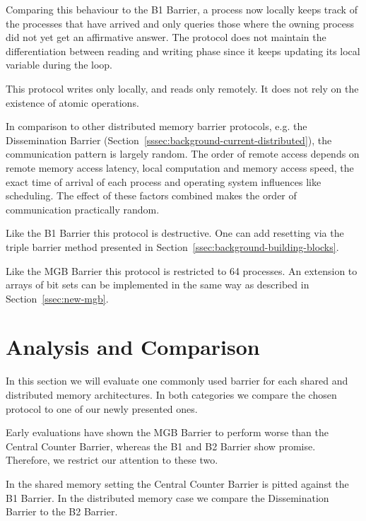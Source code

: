 \documentclass[a4paper, 10pt]{article}
\newcommand*\cleartooddpage{
	\clearpage
	\ifthenelse{\isodd{\thepage}}
		{}
		{\newpage \mbox{} \clearpage}
}
\begin{document}
Comparing this behaviour to the B1 Barrier, a process now locally keeps track of the processes that have arrived and only queries those where the owning process did not yet get an affirmative answer.
The protocol does not maintain the differentiation between reading and writing phase since it keeps updating its local variable during the loop.

This protocol writes only locally, and reads only remotely. It does not rely on the existence of atomic operations.

In comparison to other distributed memory barrier protocols, e.g. the Dissemination Barrier (Section~\ref{sssec:background-current-distributed}), the communication pattern is largely random. The order of remote access depends on remote memory access latency, local computation and memory access speed, the exact time of arrival of each process and operating system influences like scheduling. The effect of these factors combined makes the order of communication practically random.

Like the B1 Barrier this protocol is destructive. One can add resetting via the triple barrier method presented in Section~\ref{ssec:background-building-blocks}.

Like the MGB Barrier this protocol is restricted to 64 processes. An extension to arrays of bit sets can be implemented in the same way as described in Section~\ref{ssec:new-mgb}.

\cleartooddpage
\section{Analysis and Comparison}
\label{sec:analysis}

In this section we will evaluate one commonly used barrier for each shared and distributed memory architectures. In both categories we compare the chosen protocol to one of our newly presented ones.

Early evaluations have shown the MGB Barrier to perform worse than the Central Counter Barrier, whereas the B1 and B2 Barrier show promise. Therefore, we restrict our attention to these two.

In the shared memory setting the Central Counter Barrier is pitted against the B1 Barrier. In the distributed memory case we compare the Dissemination Barrier to the B2 Barrier.
\end{document}

